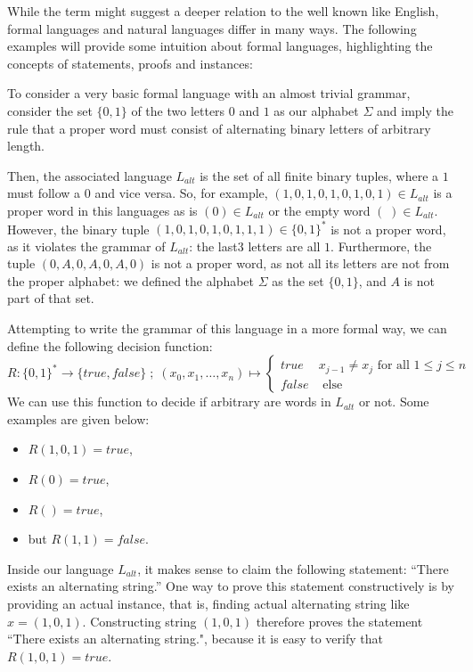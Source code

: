 While the term  might suggest a deeper relation to the well known  like English, formal languages and natural languages differ in many ways. The following examples will provide some intuition about formal languages, highlighting the concepts of statements, proofs and instances:
\begin{example} To consider a very basic formal language with an almost trivial grammar, consider the set $\{0,1\}$ of the two letters $0$ and $1$ as our alphabet $\Sigma$ and imply the rule that a proper word must consist of alternating binary letters of arbitrary length. 

Then, the associated language $L_{alt}$ is the set of all finite binary tuples, where a $1$ must follow a $0$ and vice versa. So, for example, $(1,0,1,0,1,0,1,0,1)\in L_{alt}$ is a proper word in this languages as is $(0)\in L_{alt}$ or the empty word $(\;)\in L_{alt}$. However,  the binary tuple $(1,0,1,0,1,0,1,1,1)\in \{0,1\}^*$ is not a proper word, as it violates the grammar of $L_{alt}$: the last3 letters are all $1$. Furthermore, the tuple $(0,A,0,A,0,A,0)$ is not a proper word, as not all its letters are not from the proper alphabet: we defined the alphabet $\Sigma$ as the set $\{0,1\}$, and $A$ is not part of that set. 

Attempting to write the grammar of this language in a more formal way, we can define the following decision function:
$$
R: \{0,1\}^* \to \{true,false\}\;;\; (x_0,x_1,\ldots,x_n) \mapsto 
\begin{cases}
true & x_{j-1} \neq x_{j} \text{ for all } 1\leq j \leq n \\
false & \text{ else}
\end{cases}
$$
We can use this function to decide if arbitrary  are words in $L_{alt}$ or not. Some examples are given below:

\begin{itemize} 
\item $R(1,0,1)=true$, 
\item $R(0)=true$, 
\item $R()=true$, 
\item but $R(1,1)=false $.
\end{itemize}

Inside our language $L_{alt}$, it makes sense to claim the following statement: ``There exists an alternating string.'' One way to prove this statement constructively is by providing an actual instance, that is, finding actual alternating string like $x = (1,0,1)$. Constructing string $(1,0,1)$ therefore proves the statement ``There exists an alternating string.", because it is easy to verify that $R(1,0,1)=true$.
\end{example}
